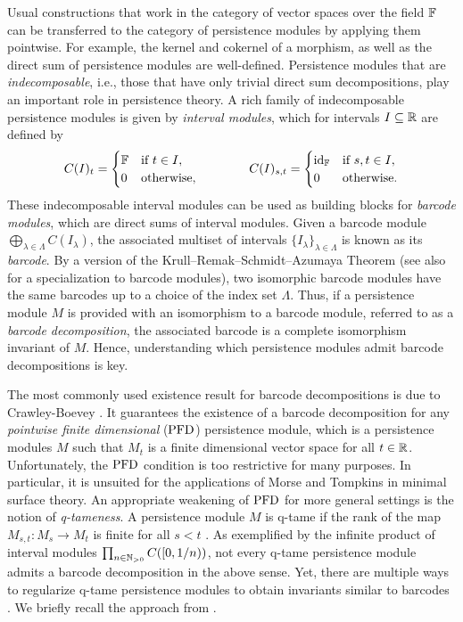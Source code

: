 Usual constructions that work in the category of vector spaces over the field $\mathbb{F}$ can be transferred to the category of persistence modules by applying them pointwise.
For example, the kernel and cokernel of a morphism, as well as the direct sum of persistence modules are well-defined.
Persistence modules that are \emph{indecomposable}, i.e., those that have only trivial direct sum decompositions, play an important role in persistence theory.
A rich family of indecomposable persistence modules is given by \emph{interval modules}, which for intervals $I \subseteq \mathbb{R}$ are defined by
\begin{equation*}
C(I)_t =
\begin{cases}
\mathbb{F} & \text{if } t \in I, \\
0 & \text{otherwise},
\end{cases}
\qquad \qquad
C(I)_{s, t} =
\begin{cases}
\operatorname{id}_{\mathbb{F}} & \text{if } s, t \in I, \\
0 & \text{otherwise}.
\end{cases}
\end{equation*}
These indecomposable interval modules can be used as building blocks for \emph{barcode modules}, which are direct sums of interval modules.
Given a barcode module $\bigoplus_{\lambda \in \Lambda} C(I_{\lambda})$, the associated multiset of intervals $\{I_{\lambda}\}_{\lambda \in \Lambda}$ is known as its \emph{barcode}.
By a version of the Krull--Remak--Schmidt--Azumaya Theorem \cite{Azumaya.1950} (see also \cite[Theorem 2.7]{Chazal.2016a} for a specialization to barcode modules), two isomorphic barcode modules have the same barcodes up to a choice of the index set $\Lambda$.
Thus, if a persistence module $M$ is provided with an isomorphism to a barcode module, referred to as a \emph{barcode decomposition}, the associated barcode is a complete isomorphism invariant of $M$.
Hence, understanding which persistence modules admit barcode decompositions is key.

The most commonly used existence result for barcode decompositions is due to Crawley-Boevey \cite{Crawley-Boevey.2015}.
It guarantees the existence of a barcode decomposition for any \emph{pointwise finite dimensional} ($\mathrm{PFD}$) persistence module, which is a persistence modules $M$ such that $M_t$ is a finite dimensional vector space for all $t \in \mathbb{R}$.
Unfortunately, the $\mathrm{PFD}$ condition is too restrictive for many purposes.
In particular, it is unsuited for the applications of Morse and Tompkins in minimal surface theory.
An appropriate weakening of $\mathrm{PFD}$ for more general settings is the notion of \emph{q-tameness}.
A persistence module $M$ is q-tame if the rank of the map $M_{s,t} \colon M_s \to M_t$ is finite for all $s < t$ \cite{Chazal.2016a}.
As exemplified by the infinite product of interval modules $\prod_{n \in \mathbb{N}_{> 0}} C([0,1/n))$, not every q-tame persistence module admits a barcode decomposition in the above sense.
Yet, there are multiple ways to regularize q-tame persistence modules to obtain invariants similar to barcodes \cite{Chazal.2016a, Chazal.2016b, Schmahl.2021}.
We briefly recall the approach from \cite{Chazal.2016b}.

